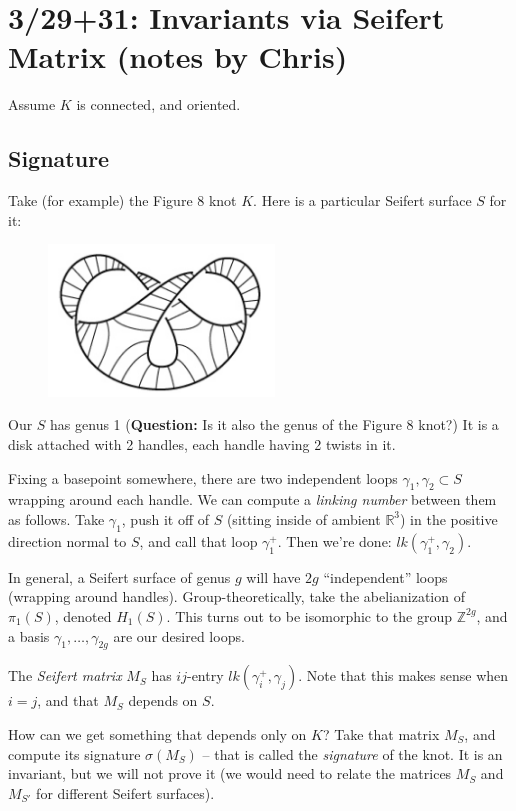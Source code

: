 \documentclass[11pt]{article}
\newcommand{\Z}{\mathbb{Z}}
\newcommand{\R}{\mathbb{R}}
\theoremstyle{plain}
\theoremstyle{definition}
\begin{document}
\clearpage
\section{3/29+31: Invariants via Seifert Matrix (notes by Chris)}

Assume $K$ is connected, and oriented.

\subsection{Signature}

Take (for example) the Figure 8 knot $K$. Here is a particular Seifert surface $S$ for it:

\begin{figure}[h]
  \centering
  \includegraphics[width=6cm]{Seifert.png}
\end{figure}

Our $S$ has genus 1 (\textbf{Question:} Is it also the genus of the Figure 8 knot?) It is a disk attached with 2 handles, each handle having 2 twists in it.

Fixing a basepoint somewhere, there are two independent loops $\gamma_1,\gamma_2\subset S$ wrapping around each handle. We can compute a \textit{linking number} between them as follows. Take $\gamma_1$, push it off of $S$ (sitting inside of ambient $\R^3$) in the positive direction normal to $S$, and call that loop $\gamma_1^+$. Then we're done: $lk(\gamma_1^+,\gamma_2)$.

\bigskip
In general, a Seifert surface of genus $g$ will have $2g$ ``independent'' loops (wrapping around handles). Group-theoretically, take the abelianization of $\pi_1(S)$, denoted $H_1(S)$. This turns out to be isomorphic to the group $\Z^{2g}$, and a basis $\gamma_1,\ldots,\gamma_{2g}$ are our desired loops.

\bigskip
The \textit{Seifert matrix} $M_S$ has $ij$-entry $lk(\gamma_i^+,\gamma_j)$. Note that this makes sense when $i=j$, and that $M_S$ depends on $S$.

\bigskip
How can we get something that depends only on $K$? Take that matrix $M_S$, and compute its signature $\sigma(M_S)$ -- that is called the \textit{signature} of the knot. It is an invariant, but we will not prove it (we would need to relate the matrices $M_S$ and $M_{S'}$ for different Seifert surfaces).
\end{document}
